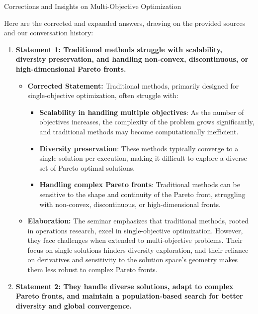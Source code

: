 \documentclass[
]{article}
\author{}
\date{}
\begin{document}
{Corrections and Insights on Multi-Objective
Optimization}\label{corrections-and-insights-on-multi-objective-optimization}

Here are the corrected and expanded answers, drawing on the provided
sources and our conversation history:

\begin{enumerate}
\def\labelenumi{\arabic{enumi}.}
\item
  \textbf{Statement 1: Traditional methods struggle with scalability,
  diversity preservation, and handling non-convex, discontinuous, or
  high-dimensional Pareto fronts.}

  \begin{itemize}
  
  \item
    \textbf{Corrected Statement:} Traditional methods, primarily
    designed for single-objective optimization, often struggle with:

    \begin{itemize}
    
    \item
      \textbf{Scalability in handling multiple objectives}: As the
      number of objectives increases, the complexity of the problem
      grows significantly, and traditional methods may become
      computationally inefficient.
    \item
      \textbf{Diversity preservation}: These methods typically converge
      to a single solution per execution, making it difficult to explore
      a diverse set of Pareto optimal solutions.
    \item
      \textbf{Handling complex Pareto fronts}: Traditional methods can
      be sensitive to the shape and continuity of the Pareto front,
      struggling with non-convex, discontinuous, or high-dimensional
      fronts.
    \end{itemize}
  \item
    \textbf{Elaboration:} The seminar emphasizes that traditional
    methods, rooted in operations research, excel in single-objective
    optimization. However, they face challenges when extended to
    multi-objective problems. Their focus on single solutions hinders
    diversity exploration, and their reliance on derivatives and
    sensitivity to the solution space's geometry makes them less robust
    to complex Pareto fronts.
  \end{itemize}
\item
  \textbf{Statement 2: They handle diverse solutions, adapt to complex
  Pareto fronts, and maintain a population-based search for better
  diversity and global convergence.}


\end{enumerate}
\end{document}
